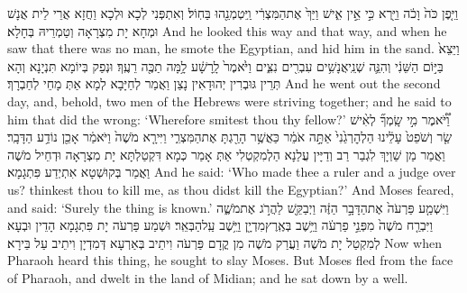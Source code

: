 {וַיִּ֤פֶן כֹּה֙ וָכֹ֔ה וַיַּ֖רְא כִּ֣י אֵ֣ין אִ֑ישׁ וַיַּךְ֙ אֶת\maqqaf הַמִּצְרִ֔י וַֽיִּטְמְנֵ֖הוּ בַּחֽוֹל׃}
{וְאִתְפְּנִי לְכָא וּלְכָא וַחֲזָא אֲרֵי לֵית אֲנָשׁ וּמְחָא יָת מִצְרָאָה וְטַמְרֵיהּ בְּחָלָא׃}
{And he looked this way and that way, and when he saw that there was no man, he smote the Egyptian, and hid him in the sand.}{}
{וַיֵּצֵא֙ בַּיּ֣וֹם הַשֵּׁנִ֔י וְהִנֵּ֛ה שְׁנֵֽי\maqqaf אֲנָשִׁ֥ים עִבְרִ֖ים נִצִּ֑ים וַיֹּ֙אמֶר֙ לָֽרָשָׁ֔ע לָ֥מָּה תַכֶּ֖ה רֵעֶֽךָ׃}
{וּנְפַק בְּיוֹמָא תִּנְיָנָא וְהָא תְּרֵין גּוּבְרִין יְהוּדָאִין נָצַן וַאֲמַר לְחַיָּבָא לְמָא אַתְּ מָחֵי לְחַבְרָךְ׃}
{And he went out the second day, and, behold, two men of the Hebrews were striving together; and he said to him that did the wrong: ‘Wherefore smitest thou thy fellow?’}{}
{וַ֠יֹּ֠אמֶר מִ֣י שָֽׂמְךָ֞ לְאִ֨ישׁ שַׂ֤ר וְשֹׁפֵט֙ עָלֵ֔ינוּ הַלְהׇרְגֵ֙נִי֙ אַתָּ֣ה אֹמֵ֔ר כַּאֲשֶׁ֥ר הָרַ֖גְתָּ אֶת\maqqaf הַמִּצְרִ֑י וַיִּירָ֤א מֹשֶׁה֙ וַיֹּאמַ֔ר אָכֵ֖ן נוֹדַ֥ע הַדָּבָֽר׃}
{וַאֲמַר מַן שַׁוְיָךְ לִגְבַר רַב וְדַיָּין עֲלַנָא הַלְמִקְטְלִי אַתְּ אָמַר כְּמָא דִּקְטַלְתָּא יָת מִצְרָאָה וּדְחֵיל מֹשֶׁה וַאֲמַר בְּקוּשְׁטָא אִתְיְדַע פִּתְגָמָא׃}
{And he said: ‘Who made thee a ruler and a judge over us? thinkest thou to kill me, as thou didst kill the Egyptian?’ And Moses feared, and said: ‘Surely the thing is known.’}{}
{וַיִּשְׁמַ֤ע פַּרְעֹה֙ אֶת\maqqaf הַדָּבָ֣ר הַזֶּ֔ה וַיְבַקֵּ֖שׁ לַהֲרֹ֣ג אֶת\maqqaf מֹשֶׁ֑ה וַיִּבְרַ֤ח מֹשֶׁה֙ מִפְּנֵ֣י פַרְעֹ֔ה וַיֵּ֥שֶׁב בְּאֶֽרֶץ\maqqaf מִדְיָ֖ן וַיֵּ֥שֶׁב עַֽל\maqqaf הַבְּאֵֽר׃}
{וּשְׁמַע פַּרְעֹה יָת פִּתְגָמָא הָדֵין וּבְעָא לְמִקְטַל יָת מֹשֶׁה וַעֲרַק מֹשֶׁה מִן קֳדָם פַּרְעֹה וִיתֵיב בְּאַרְעָא דְּמִדְיָן וִיתֵיב עַל בֵּירָא׃}
{Now when Pharaoh heard this thing, he sought to slay Moses. But Moses fled from the face of Pharaoh, and dwelt in the land of Midian; and he sat down by a well.}{}
